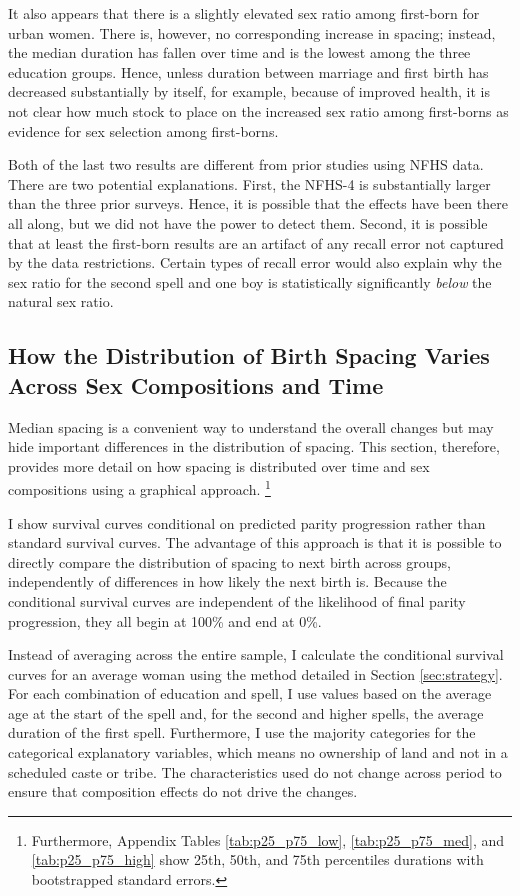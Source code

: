 \documentclass[12pt,letterpaper]{article}
\begin{document}
It also appears that there is a slightly elevated sex ratio among 
first-born for urban women. 
There is, however, no corresponding increase in spacing; instead,
the median duration has fallen over time and is the lowest among
the three education groups.
Hence, unless duration between marriage and first birth has decreased 
substantially by itself, for example, because of improved health, it
is not clear how much stock to place on the increased sex ratio
among first-borns as evidence for sex selection among first-borns.

Both of the last two results are different from prior studies using NFHS data.
There are two potential explanations.
First, the NFHS-4 is substantially larger than the three prior surveys.
Hence, it is possible that the effects have been there all along, but 
we did not have the power to detect them.
Second, it is possible that at least the first-born results are an
artifact of any recall error not captured by the data restrictions.
Certain types of recall error would also explain why the sex ratio for
the second spell and one boy is statistically significantly \emph{below} 
the natural sex ratio.


\subsection{How the Distribution of Birth Spacing Varies Across Sex Compositions and Time}

Median spacing is a convenient way to understand the overall changes but
may hide important differences in the distribution of spacing.
This section, therefore, provides more detail on how spacing is distributed
over time and sex compositions using a graphical approach.%
\footnote{
Furthermore, Appendix Tables \ref{tab:p25_p75_low}, \ref{tab:p25_p75_med}, and 
\ref{tab:p25_p75_high} show 25th, 50th, and 75th percentiles durations with
bootstrapped standard errors.
} 

I show survival curves conditional on predicted parity progression rather than
standard survival curves. 
The advantage of this approach is that it is possible to directly compare 
the distribution of spacing to next birth across groups, independently of 
differences in how likely the next birth is.
Because the conditional survival curves are independent of the likelihood
of final parity progression, they all begin at 100\% and end at 0\%.

Instead of averaging across the entire sample, I calculate the conditional
survival curves for an average woman using the method detailed in 
Section \ref{sec:strategy}.
For each combination of education and spell, I use values based on the
average age at the start of the spell and, for the second and higher
spells, the average duration of the first spell.
Furthermore, I use the majority categories for the categorical explanatory 
variables, which means no ownership of land and not in a scheduled caste or 
tribe.
The characteristics used do not change across period to ensure that 
composition effects do not drive the changes.
\end{document}
